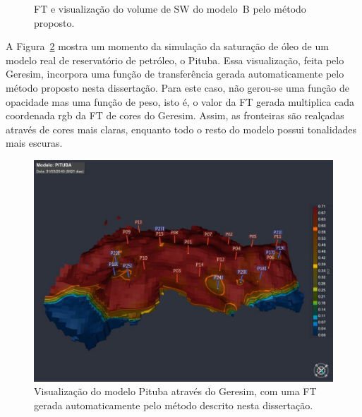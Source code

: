 \begin{figure}[h]
	\centering
	\caption{FT e visualização do volume de SW do modelo~B pelo método proposto.}
	\label{fig:r_box_sw_mine}
\end{figure}

\clearpage
	A Figura~\ref{fig:r_pituba} mostra um momento da simulação da saturação de óleo de um modelo real de reservatório de petróleo, o Pituba. Essa visualização, feita pelo Geresim, incorpora uma função de transferência gerada automaticamente pelo método proposto nesta dissertação. Para este caso, não gerou-se uma função de opacidade mas uma função de peso, isto é, o valor da FT gerada multiplica cada coordenada rgb da FT de cores do Geresim. Assim, as fronteiras são realçadas através de cores mais claras, enquanto todo o resto do modelo possui tonalidades mais escuras.
	
\begin{figure}[h]
	\centering
	\includegraphics[width=1\textwidth]{images/pituba}
	\caption{Visualização do modelo Pituba através do Geresim, com uma FT gerada automaticamente pelo método descrito nesta dissertação.}
	\label{fig:r_pituba}
\end{figure}
	
